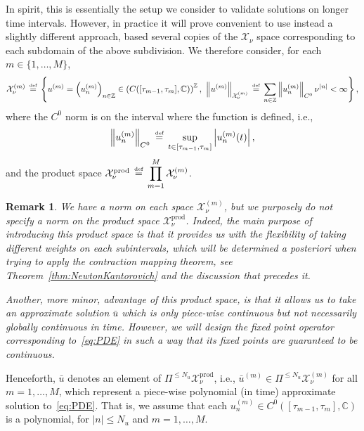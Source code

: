 \documentclass[10pt,a4paper]{article}
\theoremstyle{plain}
\newtheorem{remark}[theorem]{Remark}
\newcommand{\ZZ}{\mathbb Z}
\newcommand{\CC}{\mathbb C}
\newcommand{\X}{\mathcal{X}}
\newcommand{\bu}{\bar{u}}
\newcommand{\1}{\mathbf{1}}
\newcommand{\ds}{\displaystyle}
\newcommand{\pprod}{\mathrm{prod}}
\newcommand{\bydef}{\,\stackrel{\mbox{\tiny\textnormal{\raisebox{0ex}[0ex][0ex]{def}}}}{=}\,}
\newcommand{\Nu}{N_{u}}
\begin{document}
In spirit, this is essentially the setup we consider to validate solutions on longer time intervals. However, in practice it will prove convenient to use instead a slightly different approach, based several copies of the $\X_\nu$ space corresponding to each subdomain of the above subdivision. We therefore consider, for each $m\in\{1,\ldots,M\}$,
\begin{align*}
\X_\nu^{(m)} \bydef \left\{ u^{(m)} = \left(u^{(m)}_n\right)_{n\in\ZZ}\in \left(C([\tau_{m-1},\tau_m],\CC)\right)^\ZZ,\ \left\Vert u^{(m)}\right\Vert_{\X_\nu^{(m)}} \bydef \sum_{n\in\ZZ} \left\Vert u^{(m)}_n\right\Vert_{C^0} \nu^{\vert n\vert} < \infty \right\},
\end{align*}
where the $C^0$ norm is on the interval where the function is defined, i.e.,
\begin{align*}
\left\Vert u^{(m)}_n\right\Vert_{C^0} \bydef \sup\limits_{t\in [\tau_{m-1},\tau_m]} \left\vert u^{(m)}_n(t)\right\vert,
\end{align*}
%
and the product space $\X_\nu^\pprod \bydef \ds \prod_{m=1}^M \X_\nu^{(m)}$. 
\begin{remark}
We have a norm on each space $\X_\nu^{(m)}$, but we purposely do not specify a norm on the product space $\X_\nu^\pprod$. Indeed, the main purpose of introducing this product space is that it provides us with the flexibility of taking different weights on each subintervals, which will be determined a posteriori when trying to apply the contraction mapping theorem, see Theorem~\ref{thm:NewtonKantorovich} and the discussion that precedes it.

Another, more minor, advantage of this product space, is that it allows us to take an approximate solution $\bu$ which is only piece-wise continuous but not necessarily globally continuous in time. However, we will design the fixed point operator corresponding to~\eqref{eq:PDE} in such a way that its fixed points are guaranteed to be continuous. 
\end{remark}
Henceforth, $\bu$ denotes an element of $\Pi^{\leq \Nu}\X_\nu^\pprod$, i.e., $\bu^{(m)}\in \Pi^{\leq \Nu}\X_\nu^{(m)}$ for all $m=1,\ldots,M$, which represent a piece-wise polynomial (in time) approximate solution to~\eqref{eq:PDE}. That is, we assume that each $u^{(m)}_n\in C^0([\tau_{m-1},\tau_m],\CC)$ is a polynomial, for $\vert n\vert\leq \Nu$ and $m=1,\ldots,M$.

\medskip
\end{document}
